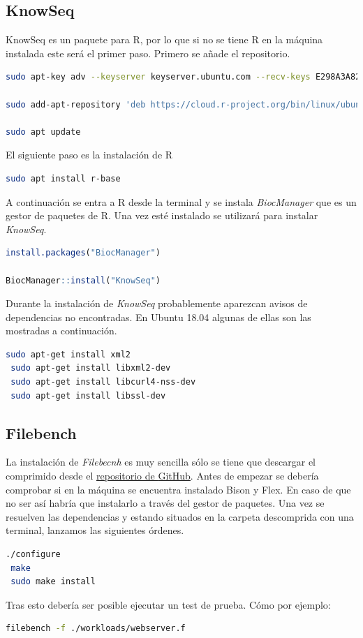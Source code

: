 \subsection{KnowSeq}
KnowSeq es un paquete para R, por lo que si no se tiene R en la máquina instalada este será el primer paso. Primero se añade el repositorio.
\begin{lstlisting}[language=bash]
sudo apt-key adv --keyserver keyserver.ubuntu.com --recv-keys E298A3A825C0D65DFD57CBB651716619E084DAB9

sudo add-apt-repository 'deb https://cloud.r-project.org/bin/linux/ubuntu bionic-cran40/'

sudo apt update
\end{lstlisting}
El siguiente paso es la instalación de R
\begin{lstlisting}[language=bash]
sudo apt install r-base
\end{lstlisting}
A continuación se entra a R desde la terminal y se instala \textit{BiocManager} que es un gestor de paquetes de R. Una vez esté instalado se utilizará para instalar \textit{KnowSeq}.
\begin{lstlisting}[language=R]
install.packages("BiocManager")

BiocManager::install("KnowSeq")
\end{lstlisting}
Durante la instalación de \textit{KnowSeq} probablemente aparezcan avisos de dependencias no encontradas. En Ubuntu 18.04 algunas de ellas son las mostradas a continuación.

\begin{lstlisting}[language=bash]
 sudo apt-get install xml2
 sudo apt-get install libxml2-dev
 sudo apt-get install libcurl4-nss-dev
 sudo apt-get install libssl-dev

\end{lstlisting}
\subsection{Filebench}
 La instalación de \textit{Filebecnh} es muy sencilla sólo se tiene que descargar el comprimido desde el \href{https://github.com/filebench/filebench/releases}{repositorio de \underline{GitHub}}. Antes de empezar se debería comprobar si en la máquina se encuentra instalado Bison y Flex. En caso de que no ser así habría que instalarlo a través del gestor de paquetes. Una vez se resuelven las dependencias y estando situados en la carpeta descomprida con una terminal, lanzamos las siguientes órdenes. 

\begin{lstlisting}[language=bash]
 ./configure
 make
 sudo make install
\end{lstlisting}

Tras esto debería ser posible ejecutar un test de prueba. Cómo por ejemplo:
\begin{lstlisting}[language=bash]
 filebench -f ./workloads/webserver.f
\end{lstlisting}